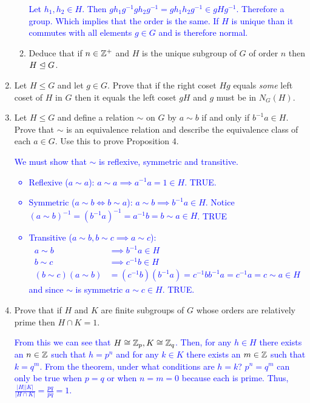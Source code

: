 \documentclass[10pt,a4paper]{report}
\newcommand{\BLUE}[1]{\textcolor{blue}{#1}}
\begin{document}
\begin{enumerate}
\begin{enumerate}
		\BLUE{Let $h_1, h_2 \in H$.  Then $gh_1g^{-1}gh_2g^{-1} = gh_1h_2g^{-1} \in gHg^{-1}$.  Therefore a group. Which implies that the order is the same.  If $H$ is unique than it commutes with all elements $g \in G$ and is therefore normal.
		}
		
		\item Deduce that if $n \in \mathbb{Z}^+$ and $H$ is the unique subgroup of $G$ of order $n$ then $H \trianglelefteq G$.
	\end{enumerate}
	
	\item Let $H \le G$ and let $g \in G$.  Prove that if the right coset $Hg$ equals \textit{some} left coset of $H$ in $G$ then it equals the left coset $gH$ and $g$ must be in $N_G(H)$.
	
	\item Let $H \le G$ and define a relation $\sim$ on $G$ by $a \sim b$ if and only if $b^{-1}a \in H$.  Prove that $\sim$ is an equivalence relation and describe the equivalence class of each $a \in G$.  Use this to prove Proposition 4.
	
	\BLUE{We must show that $\sim$ is reflexive, symmetric and transitive.
	\begin{itemize}
	\item Reflexive ($a\sim a$): $a\sim a \implies a^{-1}a =1 \in H$.  TRUE.
	\item Symmetric ($a\sim b \iff b \sim a$): $a \sim b \implies b^{-1}a \in H$.  Notice $(a \sim b)^{-1} = (b^{-1}a)^{-1} = a^{-1}b = b\sim a \in H$.  TRUE
	\item Transitive ($a\sim b, b \sim c \implies a \sim c$):
	\begin{align*}
		a \sim b &\implies b^{-1}a \in H\\
		b \sim c &\implies c^{-1}b \in H\\
		(b\sim c)(a \sim b) &= (c^{-1}b)(b^{-1}a) = c^{-1}bb^{-1}a = c^{-1}a = c \sim a \in H 
	\end{align*}and since $\sim$ is symmetric $a\sim c \in H$.  TRUE.
	\end{itemize}
	}
	
	\item Prove that if $H$ and $K$ are finite subgroups of $G$ whose orders are relatively prime then $H \cap K = 1$.
	
	\BLUE{From this we can see that $H \cong \mathbb{Z}_p, K \cong \mathbb{Z}_q$.  Then, for any $h \in H$ there exists an $n \in \mathbb{Z}$ such that $h = p^n$ and for any $k \in K$ there exists an $m \in \mathbb{Z}$ such that $k=q^m$. From the theorem, under what conditions are $h=k$?  $p^n=q^m$ can only be true when $p=q$ or when $n=m=0$ because each is prime.  Thus, $\frac{|H||K|}{|H\cap K|} = \frac{pq}{pq}=1$.
	}
	

\end{enumerate}
\end{document}
